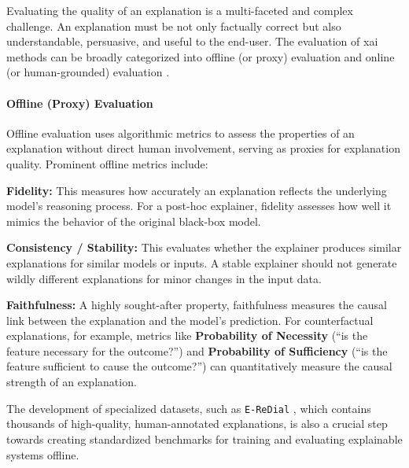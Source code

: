 Evaluating the quality of an explanation is a multi-faceted and complex challenge. An explanation must be not only factually correct but also understandable, persuasive, and useful to the end-user. The evaluation of \ac{xai} methods can be broadly categorized into offline (or proxy) evaluation and online (or human-grounded) evaluation \cite{SOTA-EXP-EVALUATION}.

\paragraph{Offline (Proxy) Evaluation}
Offline evaluation uses algorithmic metrics to assess the properties of an explanation without direct human involvement, serving as proxies for explanation quality. Prominent offline metrics include:
\begin{compactitem}[\textbullet]
    \item \textbf{Fidelity:} This measures how accurately an explanation reflects the underlying model's reasoning process. For a post-hoc explainer, fidelity assesses how well it mimics the behavior of the original black-box model.
    \item \textbf{Consistency / Stability:} This evaluates whether the explainer produces similar explanations for similar models or inputs. A stable explainer should not generate wildly different explanations for minor changes in the input data.
    \item \textbf{Faithfulness:} A highly sought-after property, faithfulness measures the causal link between the explanation and the model's prediction. For counterfactual explanations, for example, metrics like \textbf{Probability of Necessity} (``is the feature necessary for the outcome?'') and \textbf{Probability of Sufficiency} (``is the feature sufficient to cause the outcome?'') can quantitatively measure the causal strength of an explanation.
\end{compactitem}

The development of specialized datasets, such as \texttt{E-ReDial} \cite{SOTA-EXPLAIN-CRS}, which contains thousands of high-quality, human-annotated explanations, is also a crucial step towards creating standardized benchmarks for training and evaluating explainable systems offline.

